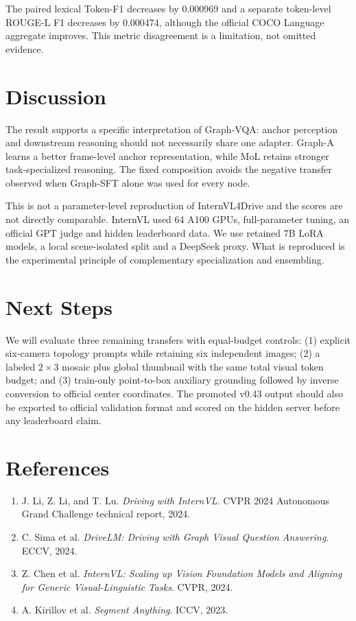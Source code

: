 \documentclass[10pt,twocolumn]{article}
\begin{document}
The paired lexical Token-F1 decreases by 0.000969 and a separate token-level
ROUGE-L F1 decreases by 0.000474, although the official COCO Language aggregate
improves. This metric disagreement is a limitation, not omitted evidence.

\section{Discussion}
The result supports a specific interpretation of Graph-VQA: anchor perception
and downstream reasoning should not necessarily share one adapter. Graph-A
learns a better frame-level anchor representation, while MoL retains stronger
task-specialized reasoning. The fixed composition avoids the negative transfer
observed when Graph-SFT alone was used for every node.

This is not a parameter-level reproduction of InternVL4Drive and the scores are
not directly comparable. InternVL used 64 A100 GPUs, full-parameter tuning, an
official GPT judge and hidden leaderboard data. We use retained 7B LoRA models,
a local scene-isolated split and a DeepSeek proxy. What is reproduced is the
experimental principle of complementary specialization and ensembling.

\section{Next Steps}
We will evaluate three remaining transfers with equal-budget controls: (1)
explicit six-camera topology prompts while retaining six independent images;
(2) a labeled $2\times3$ mosaic plus global thumbnail with the same total visual
token budget; and (3) train-only point-to-box auxiliary grounding followed by
inverse conversion to official center coordinates. The promoted v0.43 output
should also be exported to official validation format and scored on the hidden
server before any leaderboard claim.

\section*{References}
\small
\begin{enumerate}
\item J. Li, Z. Li, and T. Lu. \emph{Driving with InternVL}. CVPR 2024
Autonomous Grand Challenge technical report, 2024.
\item C. Sima et al. \emph{DriveLM: Driving with Graph Visual Question
Answering}. ECCV, 2024.
\item Z. Chen et al. \emph{InternVL: Scaling up Vision Foundation Models and
Aligning for Generic Visual-Linguistic Tasks}. CVPR, 2024.
\item A. Kirillov et al. \emph{Segment Anything}. ICCV, 2023.
\end{enumerate}
\end{document}
